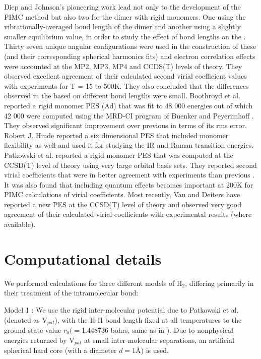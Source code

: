         Diep and Johnson's \cite{Diep2000} pioneering work lead not only to the development of the PIMC method but also two \abinitio{} \PESs{} for the dimer with rigid monomers. One using the vibrationally-averaged bond length of the dimer and another using a slightly smaller equilibrium value, in order to study the effect of bond lengths on the \PESs{}. Thirty seven unique angular configurations were used in the construction of these \PESs{} (and their corresponding spherical harmonics fits) and electron correlation effects were accounted at the MP2, MP3, MP4 and CCDS(T) levels of theory. They observed excellent agreement of their calculated second virial coefficient values with experiments for T = 15 to 500K. They also concluded that the differences observed in the \PESs{} based on different bond lengths were small. Boothroyd et al. \cite{Boothroyd2002} reported a rigid monomer PES (Ad) that was fit to \Sim{} 48 000 \abinitio{} energies out of which \Sim{} 42 000 were computed using the MRD-CI program of Buenker and Peyerimhoff \cite{Buenker1974}. They observed significant improvement over previous \PESs{} in terms of its rms error. Robert J. Hinde \cite{Hinde2008} reported a six dimensional PES that included monomer flexibility as well and used it for studying the IR and Raman transition energies. Patkowski et al. \cite{Patkowski2008} reported a rigid monomer PES that was computed at the CCSD(T) level of theory using very large orbital basis sets. They reported second virial coefficients that were in better agreement with experiments than previous \PESs{}. It was also found that including quantum effects becomes important at \Sim{} 200K for PIMC calculations of virial coefficients. Most recently, Van and Deiters \cite{Tat2015} have reported a new \abinitio{} PES at the CCSD(T) level of theory and observed very good agreement of their calculated virial coefficients with experimental results (where available).

    \section{Computational details}
    \label{sec:Computational details}

        We performed calculations for three different models of H$_2$, differing primarily in their treatment of the intramolecular bond:

        Model 1 : We use the rigid inter-molecular potential due to Patkowski et al.\cite{Patkowski2008} (denoted as V$_{pat}$), with the H-H bond length fixed at all temperatures to the ground state value $r_0 ( = $1.448736 bohrs, same as in \cite{Patkowski2008}). Due to nonphysical energies returned by V$_{pat}$ at small inter-molecular separations, an artificial spherical hard core (with a diameter $d = 1${\AA}) is used.

